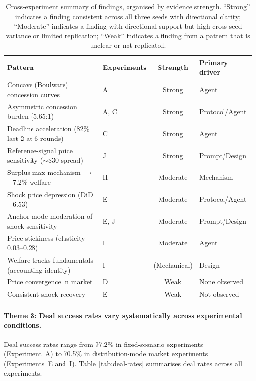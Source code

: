 \begin{table}[ht]
\centering
\caption{Cross-experiment summary of findings, organised by evidence strength.  ``Strong'' indicates a finding consistent across all three seeds with directional clarity; ``Moderate'' indicates a finding with directional support but high cross-seed variance or limited replication; ``Weak'' indicates a finding from a pattern that is unclear or not replicated.}
\label{tab:synthesis}
\small
\begin{tabular}{@{}llcl@{}}
\toprule
Pattern & Experiments & Strength & Primary driver \\
\midrule
Concave (Boulware) concession curves & A & Strong & Agent \\
Asymmetric concession burden (5.65:1) & A, C & Strong & Protocol/Agent \\
Deadline acceleration (82\% last-2 at 6 rounds) & C & Strong & Agent \\
Reference-signal price sensitivity ($\sim$\$30 spread) & J & Strong & Prompt/Design \\
Surplus-max mechanism $\to$ +7.2\% welfare & H & Moderate & Mechanism \\
Shock price depression (DiD $-$6.53) & E & Moderate & Protocol/Agent \\
Anchor-mode moderation of shock sensitivity & E, J & Moderate & Prompt/Design \\
Price stickiness (elasticity 0.03--0.28) & I & Moderate & Agent \\
Welfare tracks fundamentals (accounting identity) & I & (Mechanical) & Design \\
Price convergence in market & D & Weak & None observed \\
Consistent shock recovery & E & Weak & Not observed \\
\bottomrule
\end{tabular}
\end{table}

\paragraph{Theme 3: Deal success rates vary systematically across experimental conditions.}
Deal success rates range from 97.2\% in fixed-scenario experiments (Experiment~A) to 70.5\% in distribution-mode market experiments (Experiments~E and~I).  Table~\ref{tab:deal-rates} summarises deal rates across all experiments.

